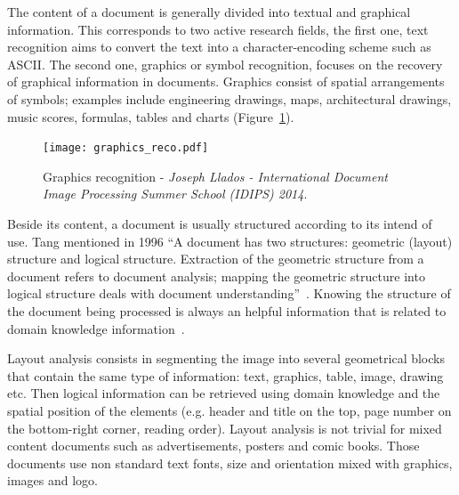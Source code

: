 


The content of a document is generally divided into textual and graphical information.
This corresponds to two active research fields, the first one, text recognition aims to convert the text into a character-encoding scheme such as ASCII.
The second one, graphics or symbol recognition, focuses on the recovery of graphical information in documents.
Graphics consist of spatial arrangements of symbols; examples include engineering drawings, maps, architectural drawings, music scores, formulas, tables and charts (Figure~\ref{fig:sota:graphics_reco}).

    \begin{figure}[t]%
      \centering
      \texttt{[image: graphics\_reco.pdf]}
    \caption[Graphics recognition]{Graphics recognition - \emph{Joseph Llados - International Document Image Processing Summer School (IDIPS) 2014}.}
    \label{fig:sota:graphics_reco}
    \end{figure}

Beside its content, a document is usually structured according to its intend of use.
Tang mentioned in 1996 ``A document has two structures: geometric (layout) structure and logical structure.
Extraction of the geometric structure from a document refers to document analysis; mapping the geometric structure into logical structure deals with document understanding''~\cite{tang1996automatic}.
Knowing the structure of the document being processed is always an helpful information that is related to domain knowledge information~\cite{cooperman1998system,breuel2003high}.

Layout analysis consists in segmenting the image into several geometrical blocks that contain the same type of information: text, graphics, table, image, drawing etc.
Then logical information can be retrieved using domain knowledge and the spatial position of the elements (e.g. header and title on the top, page number on the bottom-right corner, reading order).
Layout analysis is not trivial for mixed content documents such as advertisements, posters and comic books.
Those documents use non standard text fonts, size and orientation mixed with graphics, images and logo.%

